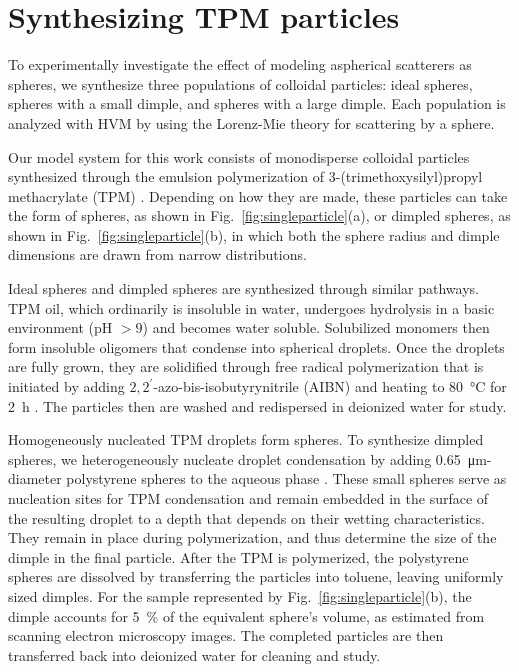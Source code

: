 \section{Synthesizing TPM particles}
\label{ssec:synthesizing_tpm}
To experimentally investigate the effect of modeling aspherical scatterers
as spheres, we synthesize three populations of colloidal particles: ideal spheres,
spheres with a small dimple, and spheres with a large dimple.
Each population is analyzed with HVM by using the Lorenz-Mie theory
for scattering by a sphere.

Our model system for this work consists of monodisperse
colloidal particles synthesized through the emulsion polymerization of
3-(trimethoxysilyl)propyl methacrylate (TPM) \cite{sacanna13,vanderwel17}.
Depending on how they are made, these particles can take the form
of spheres, as shown in Fig.~\ref{fig:singleparticle}(a), or dimpled
spheres, as shown in Fig.~\ref{fig:singleparticle}(b), in which both
the sphere radius and dimple dimensions are drawn from narrow
distributions. 

Ideal spheres and dimpled spheres are synthesized through similar pathways.
TPM oil, which ordinarily is insoluble in water,
undergoes hydrolysis in a basic environment (pH $> 9$) and becomes
water soluble.
Solubilized monomers then form insoluble oligomers that
condense into spherical droplets.
Once the droplets are fully grown, they are solidified through
free radical polymerization that is initiated by adding 
$2,2^\prime$-azo-bis-isobutyrynitrile (AIBN) and 
heating to \SI{80}{\degreeCelsius} for 
\SI{2}{\hour} \cite{sacanna13,vanderwel17}.
The particles then are washed and redispersed in deionized water
for study.

Homogeneously nucleated TPM droplets form spheres.
To synthesize dimpled spheres, we heterogeneously nucleate
droplet condensation by adding \SI{0.65}{\um}-diameter
polystyrene spheres to the aqueous phase \cite{sacanna13}.
These small spheres serve as nucleation sites for TPM condensation and remain
embedded in the surface of the resulting droplet to a depth that
depends on their wetting characteristics.
They remain in place during polymerization, and thus
determine the size of the dimple in the final particle. 
After the TPM is polymerized, the polystyrene spheres are
dissolved by transferring the particles into toluene, leaving
uniformly sized dimples.
For the sample represented by Fig.~\ref{fig:singleparticle}(b), the
dimple accounts for \SI{5}{\percent} of the equivalent sphere's
volume, as estimated from scanning electron microscopy images.
The completed particles are then transferred back into 
deionized water for cleaning and study.

